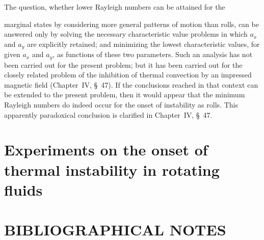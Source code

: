 The question, whether lower Rayleigh numbers can be attained for the

\noindent marginal states by considering more general patterns of motion than rolls, can be answered only by solving the necessary characteristic value problems in which $a_x$ and $a_y$ are explicitly retained; and minimizing the lowest characteristic values, for given $a_x$ and $a_y$, as functions of these two parameters. Such an analysis has not been carried out for the present problem; but it has been carried out for the closely related problem of the inhibition of thermal convection by an impressed magnetic field (Chapter~IV, \S~47). If the conclusions reached in that context can be extended to the present problem, then it would appear that the minimum Rayleigh numbers do indeed occur for the onset of instability as rolls. This apparently paradoxical conclusion is clarified in Chapter~IV, \S~47.

\section{Experiments on the onset of thermal instability in rotating fluids}\label{sec:3-35}


\section*{BIBLIOGRAPHICAL NOTES}

